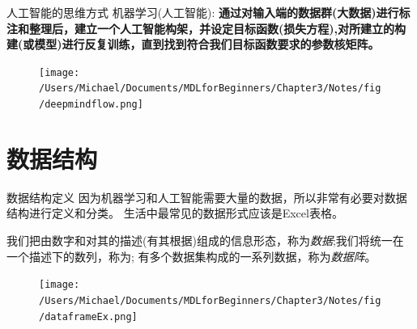 \documentclass[handout]{beamer}
\begin{document}
%

\begin{frame}{人工智能的思维方式}
机器学习(人工智能): \textbf{通过对输入端的数据群(大数据)进行标注和整理后，建立一个人工智能构架，并设定目标函数(损失方程),对所建立的构建(或模型)进行反复训练，直到找到符合我们目标函数要求的参数核矩阵。}
\begin{figure}[H]
	\centering
	\texttt{[image: /Users/Michael/Documents/MDLforBeginners/Chapter3/Notes/fig/deepmindflow.png]}
\end{figure}
\end{frame}


\section{数据结构}



\begin{frame}{数据结构定义}
	因为机器学习和人工智能需要大量的数据，所以非常有必要对数据结构进行定义和分类。 生活中最常见的数据形式应该是Excel表格。
	\begin{definition}
	我们把由数字和对其的描述(有其根据)组成的信息形态，称为\textit{数据};我们将统一在一个描述下的数列，称为; 有多个数据集构成的一系列数据，称为\textit{数据阵}。
\end{definition}
\begin{figure}[H]
	\centering
	\texttt{[image: /Users/Michael/Documents/MDLforBeginners/Chapter3/Notes/fig/dataframeEx.png]}
\end{figure}
\end{frame}
\end{document}
